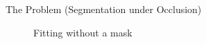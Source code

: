 \documentclass{beamer}
\begin{document}
\begin{frame}[c]{The Problem (Segmentation under Occlusion)}
	\begin{figure}
		\centering
		\qquad
		\caption{Fitting without a mask}
		\label{fig:2}
	\end{figure}
\end{frame}

\end{document}
